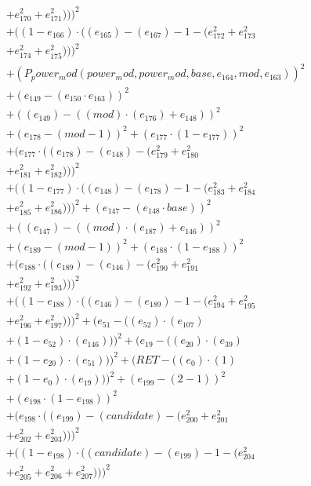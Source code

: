 \documentclass[10pt, a4paper]{article}
\begin{document}
\begin{small}
\begin{align*}
& + e_{170}^{2} + e_{171}^{2})))^{2} \\
& + ((1 - e_{166})  \cdot  ((e_{165}) - (e_{167}) - 1 - (e_{172}^{2} + e_{173}^{2} \\
& + e_{174}^{2} + e_{175}^{2})))^{2} \\
& + (P_power_mod(power_mod, power_mod, base, e_{164}, mod, e_{163}))^{2} \\
& + (e_{149} - (e_{150}  \cdot  e_{163}))^{2} \\
& + ((e_{149}) - ((mod)  \cdot  (e_{176}) + e_{148}))^{2} \\
& + (e_{178} - (mod - 1))^{2} + (e_{177}  \cdot  (1 - e_{177}))^{2} \\
& + (e_{177}  \cdot  ((e_{178}) - (e_{148}) - (e_{179}^{2} + e_{180}^{2} \\
& + e_{181}^{2} + e_{182}^{2})))^{2} \\
& + ((1 - e_{177})  \cdot  ((e_{148}) - (e_{178}) - 1 - (e_{183}^{2} + e_{184}^{2} \\
& + e_{185}^{2} + e_{186}^{2})))^{2} + (e_{147} - (e_{148}  \cdot  base))^{2} \\
& + ((e_{147}) - ((mod)  \cdot  (e_{187}) + e_{146}))^{2} \\
& + (e_{189} - (mod - 1))^{2} + (e_{188}  \cdot  (1 - e_{188}))^{2} \\
& + (e_{188}  \cdot  ((e_{189}) - (e_{146}) - (e_{190}^{2} + e_{191}^{2} \\
& + e_{192}^{2} + e_{193}^{2})))^{2} \\
& + ((1 - e_{188})  \cdot  ((e_{146}) - (e_{189}) - 1 - (e_{194}^{2} + e_{195}^{2} \\
& + e_{196}^{2} + e_{197}^{2})))^{2} + (e_{51} - ((e_{52})  \cdot  (e_{107}) \\
& + (1 - e_{52})  \cdot  (e_{146})))^{2} + (e_{19} - ((e_{20})  \cdot  (e_{39}) \\
& + (1 - e_{20})  \cdot  (e_{51})))^{2} + (RET - ((e_{0})  \cdot  (1) \\
& + (1 - e_{0})  \cdot  (e_{19})))^{2} + (e_{199} - (2 - 1))^{2} \\
& + (e_{198}  \cdot  (1 - e_{198}))^{2} \\
& + (e_{198}  \cdot  ((e_{199}) - (candidate) - (e_{200}^{2} + e_{201}^{2} \\
& + e_{202}^{2} + e_{203}^{2})))^{2} \\
& + ((1 - e_{198})  \cdot  ((candidate) - (e_{199}) - 1 - (e_{204}^{2} \\
& + e_{205}^{2} + e_{206}^{2} + e_{207}^{2})))^{2} \\

\end{align*}
\end{small}
\end{document}
